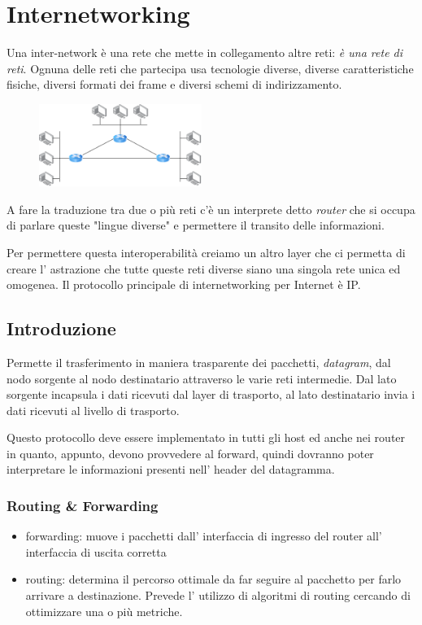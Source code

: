 \section{Internetworking}
Una inter-network è una rete che mette in collegamento altre reti: \emph{è una rete di reti}.
Ognuna delle reti che partecipa usa tecnologie diverse, diverse caratteristiche fisiche, diversi formati dei frame e diversi schemi di indirizzamento.

\begin{figure}[H]
    \centering
    \includegraphics[width=200px]{images/5_Internetworking/inter-network.png}
\end{figure}

A fare la traduzione tra due o più reti c'è un interprete detto \emph{router} che si occupa di parlare queste "lingue diverse" e permettere il transito delle informazioni.

Per permettere questa interoperabilità creiamo un altro layer che ci permetta di creare l' astrazione che tutte queste reti diverse siano una singola rete unica ed omogenea.
Il protocollo principale di internetworking per Internet è IP.

\subsection{Introduzione}
Permette il trasferimento in maniera trasparente dei pacchetti, \emph{datagram}, dal nodo sorgente al nodo destinatario attraverso le varie reti intermedie.
Dal lato sorgente incapsula i dati ricevuti dal layer di trasporto, al lato destinatario invia i dati ricevuti al livello di trasporto.

Questo protocollo deve essere implementato in tutti gli host ed anche nei router in quanto, appunto, devono provvedere al forward, quindi dovranno poter interpretare le informazioni presenti nell' header del datagramma.


\subsubsection{Routing \& Forwarding}
\begin{itemize}
    \item forwarding: muove i pacchetti dall' interfaccia di ingresso del router all' interfaccia di uscita corretta
    \item routing: determina il percorso ottimale da far seguire al pacchetto per farlo arrivare a destinazione.
    Prevede l' utilizzo di algoritmi di routing cercando di ottimizzare una o più metriche.
\end{itemize}

